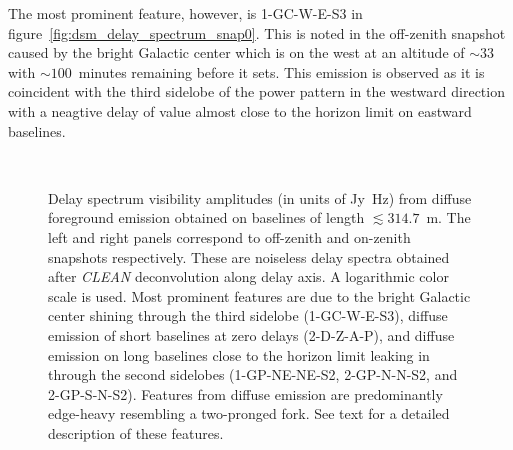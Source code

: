 \documentclass[preprint2,iop,numberedappendix]{emulateapj}
\begin{document}
The most prominent feature, however, is 1-GC-W-E-S3 in figure~\ref{fig:dsm_delay_spectrum_snap0}. This is noted in the off-zenith snapshot caused by the bright Galactic center which is on the west at an altitude of $\sim 33$\arcdeg with $\sim 100$~minutes remaining before it sets. This emission is observed as it is coincident with the third sidelobe of the power pattern in the westward direction with a neagtive delay of value almost close to the horizon limit on eastward baselines.

\begin{figure}[htp]
\centering
{}
\\
\caption{Delay spectrum visibility amplitudes (in units of Jy~Hz) from diffuse foreground emission obtained on baselines of length $\lesssim 314.7$~m. The left and right panels correspond to off-zenith and on-zenith snapshots respectively. These are noiseless delay spectra obtained after {\it CLEAN} deconvolution along delay axis. A logarithmic color scale is used. Most prominent features are due to the bright Galactic center shining through the third sidelobe (1-GC-W-E-S3), diffuse emission of short baselines at zero delays (2-D-Z-A-P), and diffuse emission on long baselines close to the horizon limit leaking in through the second sidelobes (1-GP-NE-NE-S2, 2-GP-N-N-S2, and 2-GP-S-N-S2). Features from diffuse emission are predominantly edge-heavy resembling a two-pronged fork. See text for a detailed description of these features.}
\label{fig:dsm}
\end{figure}
\end{document}

